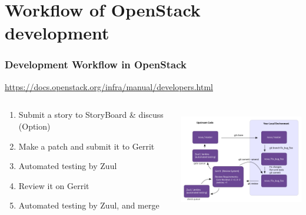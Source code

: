 \documentclass[aspectratio=169,11pt,hyperref={colorlinks=true}]{beamer}
\begin{document}
\section{Workflow of OpenStack development}
\begin{frame}
  \frametitle{Development Workflow in OpenStack}
  \url{https://docs.openstack.org/infra/manual/developers.html}
  \begin{columns}[T]
    \begin{column}{0.5\textwidth}
      \begin{enumerate}
        \item Submit a story to StoryBoard \& discuss (Option)
        \item Make a patch and submit it to Gerrit
        \item Automated testing by Zuul
        \item Review it on Gerrit
        \item Automated testing by Zuul, and merge
      \end{enumerate}
    \end{column}
    \begin{column}{0.4\textwidth}
      \centering\includegraphics[height=45mm]{images/code_review.png}
    \end{column}
  \end{columns}
\end{frame}
\end{document}
